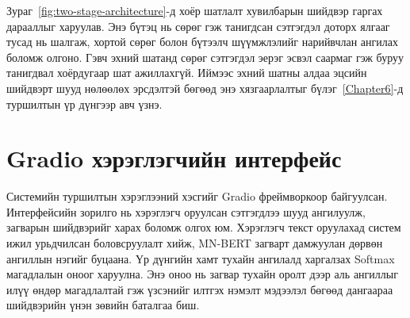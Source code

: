Зураг~\ref{fig:two-stage-architecture}-д хоёр шатлалт хувилбарын шийдвэр
гаргах дарааллыг харуулав. Энэ бүтэц нь сөрөг гэж танигдсан сэтгэгдэл доторх
ялгааг тусад нь шалгаж, хортой сөрөг болон бүтээлч шүүмжлэлийг нарийвчлан
ангилах боломж олгоно. Гэвч эхний шатанд сөрөг сэтгэгдэл эерэг эсвэл саармаг
гэж буруу танигдвал хоёрдугаар шат ажиллахгүй. Иймээс эхний шатны алдаа
эцсийн шийдвэрт шууд нөлөөлөх эрсдэлтэй бөгөөд энэ хязгаарлалтыг
бүлэг~\ref{Chapter6}-д туршилтын үр дүнгээр авч үзнэ.

\section{Gradio хэрэглэгчийн интерфейс}
\label{sec:gradio}

Системийн туршилтын хэрэглээний хэсгийг Gradio фреймворкоор байгуулсан.
Интерфейсийн зорилго нь хэрэглэгч оруулсан сэтгэгдлээ шууд ангилуулж, загварын
шийдвэрийг харах боломж олгох юм. Хэрэглэгч текст оруулахад систем ижил
урьдчилсан боловсруулалт хийж, MN-BERT загварт дамжуулан дөрвөн ангиллын нэгийг
буцаана. Үр дүнгийн хамт тухайн ангилалд харгалзах Softmax магадлалын оноог
харуулна. Энэ оноо нь загвар тухайн оролт дээр аль ангиллыг илүү өндөр
магадлалтай гэж үзсэнийг илтгэх нэмэлт мэдээлэл бөгөөд дангаараа шийдвэрийн
үнэн зөвийн баталгаа биш.


